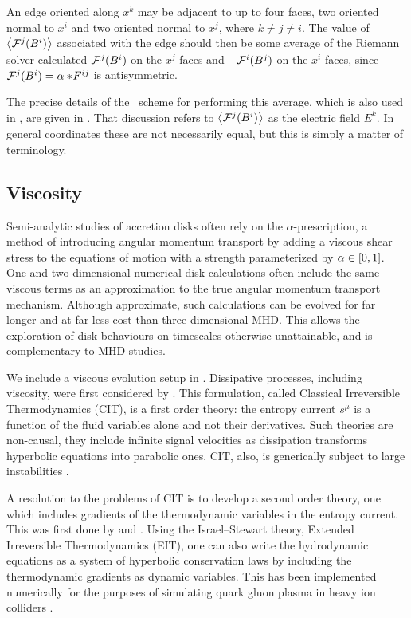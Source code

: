 An edge oriented along $x^k$ may be adjacent to up to four faces, two oriented normal to $x^i$ and two oriented normal to $x^j$, where $k\neq j \neq i$.  The value of $\left \langle \mathcal{F}^j(B^i) \right \rangle$ associated with the edge should then be some average of the Riemann solver calculated $\mathcal{F}^j(B^i)$ on the $x^j$ faces and $-\mathcal{F}^i(B^j)$ on the $x^i$ faces, since$\mathcal{F}^j(B^i) = \alpha *\! F^{ij}$ is antisymmetric.

The precise details of the \disco\ scheme for performing this average, which is also used in \grdisco, are given in \citet{Duffell16}.  That discussion refers to $\left \langle \mathcal{F}^j(B^i) \right \rangle$ as the electric field $E^k$.  In general coordinates these are not necessarily equal, but this is simply a matter of terminology.


\subsection{Viscosity}

Semi-analytic studies of accretion disks often rely on the $\alpha$-prescription, a method of introducing angular momentum transport by adding a viscous shear stress to the equations of motion with a strength parameterized by $\alpha \in [0,1]$.  One and two dimensional numerical disk calculations often include the same viscous terms as an approximation to the true angular momentum transport mechanism.  Although approximate, such calculations can be evolved for far longer and at far less cost than three dimensional MHD.  This allows the exploration of disk behaviours on timescales otherwise unattainable, and is complementary to MHD studies.

We include a viscous evolution setup in \grdisco.  Dissipative processes, including viscosity, were first considered by \citet{Eckart40}.  This formulation, called Classical Irreversible Thermodynamics (CIT), is a first order theory: the entropy current $s^\mu $ is a function of the fluid variables alone and not their derivatives.  Such theories are non-causal, they include infinite signal velocities as dissipation transforms hyperbolic equations into parabolic ones.  CIT, also, is generically subject to large instabilities \citep{Hiscock85}.

A resolution to the problems of CIT is to develop a second order theory, one which includes gradients of the thermodynamic variables in the entropy current.  This was first done by \citet{Israel76} and \citet{Stewart77}.  Using the Israel--Stewart theory, Extended Irreversible Thermodynamics (EIT), one can also write the hydrodynamic equations as a system of hyperbolic conservation laws by including the thermodynamic gradients as dynamic variables.  This has been implemented numerically for the purposes of simulating quark gluon plasma in heavy ion colliders \citep{DelZanna13}.

